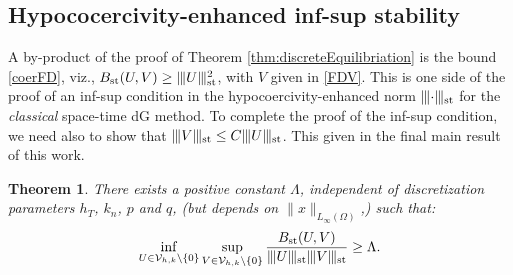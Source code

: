 \documentclass{amsart}
\newcommand{\norm}[2]{\|{#1}\|_{{#2}}}
\newcommand{\ndg}[1]{|\kern-.03cm \|{#1}|\kern-.03cm \|}
\newtheorem{theorem}{Theorem}[section]
\theoremstyle{definition}
\theoremstyle{remark}
\numberwithin{equation}{section}
\begin{document}
\subsection{Hypococercivity-enhanced inf-sup stability}\label{subsec: Error bound}
A by-product of the proof of Theorem \ref{thm:discreteEquilibriation} is the bound  \eqref{coerFD}, viz., $B_{\rm st}(U,V)
\geq
\ndg{U}_{\rm st}^2$, with $V$ given in \eqref{FDV}.  This is one side of the proof of an inf-sup condition in the hypocoercivity-enhanced norm $\ndg{\cdot}_{\rm st}$ for the \emph{classical} space-time dG method. To complete the proof of the inf-sup condition, we need also to show that $\ndg{V}_{\rm st}\le C\ndg{U}_{\rm st}$. This given in the final main result of this work.



\begin{theorem}\label{Theorem: Inf-sup}
There exists a positive constant $\Lambda$, independent of discretization parameters $h_T$, $k_n$, $p$ and $q$, (but depends on $\norm{x}{L_\infty(\Omega)}$,) such that:
\begin{equation}\label{eq: inf-sup}
\inf_{U\in  {\mathcal{V}}_{h,k}\backslash \{0\}} \sup_{V\in  {\mathcal{V}}_{h,k}\backslash \{0\}} \frac{B_{\rm st}(U,V)}{\ndg{U}_{\rm st}\ndg{V}_{\rm st}} \geq \Lambda.
\end{equation}
\end{theorem}
\end{document}
